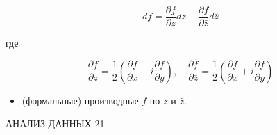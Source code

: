 \documentclass[10pt]{article}
\begin{document}
\[

d f=\frac{\partial f}{\partial z} d z+\frac{\partial f}{\partial \bar{z}} d \bar{z}

\]



где



\[

\frac{\partial f}{\partial z}=\frac{1}{2}\left(\frac{\partial f}{\partial x}-i \frac{\partial f}{\partial y}\right), \quad \frac{\partial f}{\partial \bar{z}}=\frac{1}{2}\left(\frac{\partial f}{\partial x}+i \frac{\partial f}{\partial y}\right)

\]



\begin{itemize}

  \item (формальные) производные $f$ по $z$ и $\bar{z}$.

\end{itemize}



АНАЛИЗ ДАННЫХ 21
\end{document}

